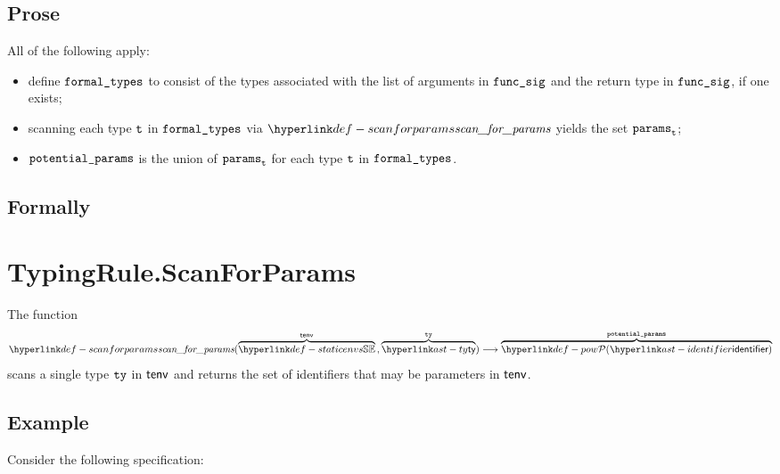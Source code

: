 \subsection{Prose}
All of the following apply:
\begin{itemize}
  \item define $\formaltypes$ to consist of the types associated with the list of arguments in $\funcsig$
        and the return type in $\funcsig$, if one exists;
  \item scanning each type $\vt$ in $\formaltypes$ via $\scanforparams$ yields the set $\vparams_\vt$;
  \item $\potentialparams$ is the union of $\vparams_\vt$ for each type $\vt$ in $\formaltypes$.
\end{itemize}

\subsection{Formally}
\begin{mathpar}
\end{mathpar}

\section{TypingRule.ScanForParams \label{sec:TypingRule.ScanForParams}}
\hypertarget{def-scanforparams}{}
The function
\[
\scanforparams(\overname{\staticenvs}{\tenv} \aslsep \overname{\ty}{\tty})
\aslto \overname{\pow{\identifier}}{\potentialparams}
\]
scans a single type $\tty$ in $\tenv$ and returns the set of
identifiers that may be parameters in $\tenv$.

\subsection{Example}
Consider the following specification:

